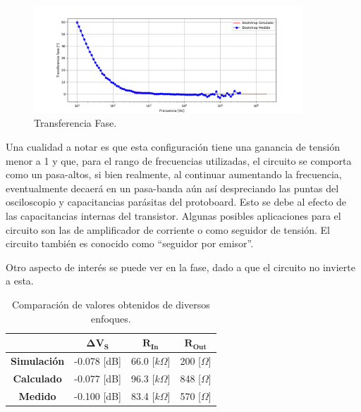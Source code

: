 \begin{figure} [H]
	\centering
	\includegraphics[width=0.9\textwidth]{imagenes/avsp.png}
	\caption{Transferencia Fase.}
	\label{fig:transph}
\end{figure}

Una cualidad a notar es que esta configuración tiene una ganancia de tensión menor a 1 y que, para el rango de frecuencias utilizadas, el circuito se comporta como un pasa-altos, si bien realmente, al continuar aumentando la frecuencia, eventualmente decaerá en un pasa-banda aún así despreciando las puntas del osciloscopio y capacitancias parásitas del protoboard. Esto se debe al efecto de las capacitancias internas del transistor. Algunas posibles aplicaciones para el circuito son las de amplificador de corriente o como seguidor de tensión. El circuito también es conocido como ``seguidor por emisor''.

Otro aspecto de interés se puede ver en la fase, dado a que el circuito no invierte a esta.
\begin{table}[H]
\centering
\begin{tabular}{cccc}
\hline                   & $\mathbf{\Delta V_S}$ & $\mathbf{R_{In}}$ & $\mathbf{R_{Out}}$ \\
\hline
\textbf{Simulación} & -0.078 [dB]          & 66.0 [$k\Omega$]    & 200 [$\Omega$]     \\
\textbf{Calculado}  & -0.077 [dB]            & 96.3 [$k\Omega$]   & 848 [$\Omega$]     \\
\textbf{Medido}     & -0.100 [dB]             & 83.4 [$k\Omega$]  & 570 [$\Omega$]   	\\
\hline
\end{tabular}
\caption{Comparación de valores obtenidos de diversos enfoques.}
\label{tabla:comparacion}
\end{table}



